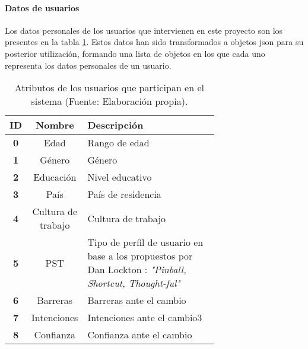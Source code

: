 \paragraph{Datos de usuarios\\}
Los datos personales de los usuarios que intervienen en este proyecto son los presentes en la tabla \ref{tab:AtributosUsuarios}. Estos datos han sido transformados a objetos json para su posterior utilización, formando una lista de objetos en los que cada uno representa los datos personales de un usuario.
\begin{table}[H]
    
    \begin{center}
        \begin{tabular}{|c|c|p{0.7\linewidth}|}
            \hline
            \rowcolor{Cyan} 
            \textbf{ID} & \textbf{Nombre} & \textbf{Descripción}\\ 
            \hline
            \textbf{0} &  Edad & Rango de edad\\
            \hline
            \rowcolor{GrisTabla}
            \textbf{1} & Género & Género\\
            \hline
            \textbf{2} & Educación & Nivel educativo\\
            \hline
            \rowcolor{GrisTabla} 
            \textbf{3} & País & País de residencia\\
            \hline
            \textbf{4} & Cultura de trabajo & Cultura de trabajo\\
            \hline
            \rowcolor{GrisTabla} 
            \textbf{5} & PST & Tipo de perfil de usuario en base a los propuestos por Dan Lockton\autocite{locktonModelsUserDesigners2012} : \textit{"Pinball, Shortcut, Thought-ful"}\\ 
            \hline
            \textbf{6} & Barreras  & Barreras ante el cambio\\
            \hline
            \rowcolor{GrisTabla} 
            \textbf{7} & Intenciones & Intenciones ante el cambio3\\
            \hline
            \textbf{8} & Confianza  & Confianza ante el cambio\\
            \hline

        \end{tabular}
        \caption{\centering Atributos de los usuarios que participan en el sistema (Fuente: Elaboración propia).}
        \label{tab:AtributosUsuarios}
    \end{center}    
\end{table}
